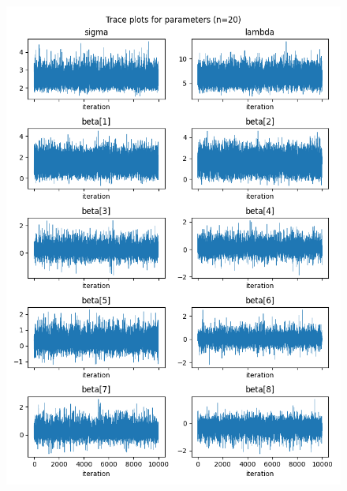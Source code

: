 \documentclass[a4paper, 10pt]{article}
\begin{document}
\begin{figure}[htb]
    \begin{center}
        \includegraphics[height=.4\textheight]{../outputs/artificial_scenarios_n=20/scenario_1/traceplots.png}

\end{center}
\end{figure}
\end{document}
